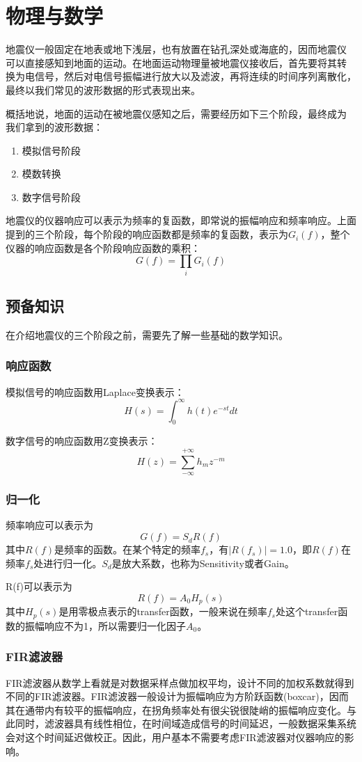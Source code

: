 \section{物理与数学}
地震仪一般固定在地表或地下浅层，也有放置在钻孔深处或海底的，因而地震仪
可以直接感知到地面的运动。在地面运动物理量被地震仪接收后，首先要将其转
换为电信号，然后对电信号振幅进行放大以及滤波，再将连续的时间序列离散化，
最终以我们常见的波形数据的形式表现出来。

概括地说，地面的运动在被地震仪感知之后，需要经历如下三个阶段，最终成为
我们拿到的波形数据：
\begin{enumerate}
\item 模拟信号阶段
\item 模数转换
\item 数字信号阶段
\end{enumerate}

地震仪的仪器响应可以表示为频率的复函数，即常说的振幅响应和频率响应。上面提到的三个阶段，每个阶段的响应函数都是频率的复函数，表示为$G_i(f)$，整个仪器的响应函数是各个阶段响应函数的乘积：
\[
    G(f)=\prod_i G_i(f)
\]

\subsection{预备知识}
在介绍地震仪的三个阶段之前，需要先了解一些基础的数学知识。
\subsubsection{响应函数}
模拟信号的响应函数用Laplace变换表示：
\[
    H(s)=\int_0^{\infty}h(t)e^{-st}dt
\]

数字信号的响应函数用Z变换表示：
\[
    H(z)=\sum_{-\infty}^{+\infty}h_m z^{-m}
\]

\subsubsection{归一化}
频率响应可以表示为
\[
    G(f)=S_d R(f)
\]
其中$R(f)$是频率的函数。在某个特定的频率$f_s$，有$|R(f_s)|=1.0$，即$R(f)$在频率$f_s$处进行归一化。$S_d$是放大系数，也称为Sensitivity或者Gain。

R(f)可以表示为
\[
    R(f)= A_0 H_p(s)
\]
其中$H_p(s)$是用零极点表示的transfer函数，一般来说在频率$f_s$处这个transfer函数的振幅响应不为1，所以需要归一化因子$A_0$。

\subsubsection{FIR滤波器}
FIR滤波器从数学上看就是对数据采样点做加权平均，设计不同的加权系数就得到不同的FIR滤波器。FIR滤波器一般设计为振幅响应为方阶跃函数(boxcar)，因而其在通带内有较平的振幅响应，在拐角频率处有很尖锐很陡峭的振幅响应变化。与此同时，滤波器具有线性相位，在时间域造成信号的时间延迟，一般数据采集系统会对这个时间延迟做校正。因此，用户基本不需要考虑FIR滤波器对仪器响应的影响。

